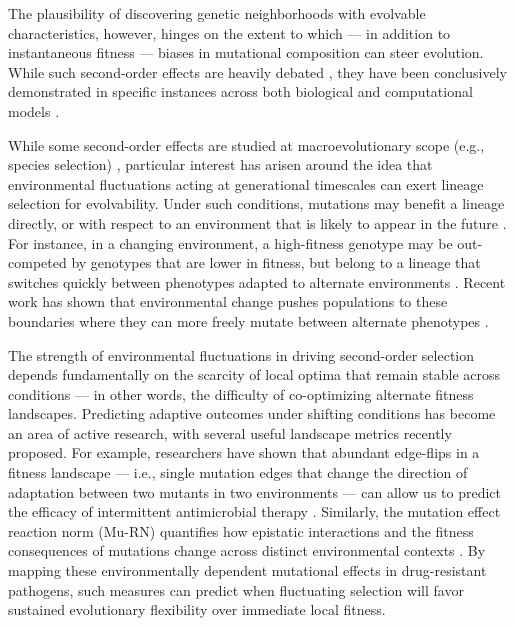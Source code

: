 The plausibility of discovering genetic neighborhoods with evolvable characteristics, however, hinges on the extent to which --- in addition to instantaneous fitness \citep{watson2016how} --- biases in mutational composition can steer evolution.
While such second-order effects are heavily debated \citep{wagner2021adaptive,akay2016there,keller1999levels,altenberg1995genome,yoshimura1996evolution,yoshimura1991individual,pigliucci2008evolvability}, they have been conclusively demonstrated in specific instances across both biological and computational models \citep{sung2012driftbarrier,wilke2001evolution,pyo2025evolutionary,wagner2021adaptive,akay2016there,keller1999levels,wagner2017information,kumawat2024evolution,barnett2025experimental,steinberg2016environmental,hayden2011cryptic,gupta2022hostparasite,zaman2014coevolution,richter2009detecting,grefenstette1999evolvability}.

While some second-order effects are studied at macroevolutionary scope (e.g., species selection) \citep{jablonski2008species,stanley1975theory,reznick2009darwin}, particular interest has arisen around the idea that environmental fluctuations acting at generational timescales \citep{bell2017evolutionary,bell2010fluctuating} can exert lineage selection for evolvability.
Under such conditions, mutations may benefit a lineage directly, or with respect to an environment that is likely to appear in the future \citep{parter2008facilitated}.
For instance, in a changing environment, a high-fitness genotype may be out-competed by genotypes that are lower in fitness, but belong to a lineage that switches quickly between phenotypes adapted to alternate environments \citep{woods2011secondorder}.
Recent work has shown that environmental change pushes populations to these boundaries where they can more freely mutate between alternate phenotypes \citep{kumawat2024evolution,barnett2025experimental,kussell2006polymerpopulation,ancel2005evolution}.

The strength of environmental fluctuations in driving second-order selection depends fundamentally on the scarcity of local optima that remain stable across conditions --- in other words, the difficulty of co-optimizing alternate fitness landscapes.
Predicting adaptive outcomes under shifting conditions has become an area of active research, with several useful landscape metrics recently proposed.
For example, researchers have shown that abundant edge-flips in a fitness landscape --- i.e., single mutation edges that change the direction of adaptation between two mutants in two environments --- can allow us to predict the efficacy of intermittent antimicrobial therapy \citep{chen2024inverted}.
Similarly, the mutation effect reaction norm (Mu-RN) quantifies how epistatic interactions and the fitness consequences of mutations change across distinct environmental contexts \citep{ogbunugafor2022mutation}.
By mapping these environmentally dependent mutational effects in drug-resistant pathogens, such measures can predict when fluctuating selection will favor sustained evolutionary flexibility over immediate local fitness.

